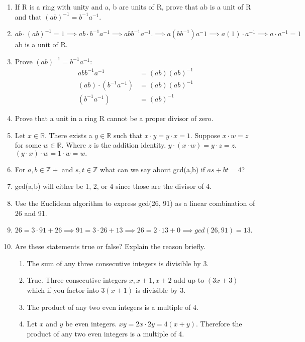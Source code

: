 \documentclass[letterpaper,11pt]{article}
\begin{document}
\begin{enumerate}
    \item If R is a ring with unity and a, b are units of R, prove that ab is a unit of R and that $(ab)^{-1} = b^{-1}a^{-1}$.
    \item[] $ab \cdot (ab)^{-1} = 1 \implies ab \cdot b^{-1}a^{-1} \implies abb^{-1}a^{-1}. \implies a(bb^{-1})a^-1 \implies a(1) \cdot a^{-1} \implies a \cdot a^{-1} = 1$ ab is a unit of R.
    \item[] Prove $(ab)^{-1} = b^{-1}a^{-1}:$ 
    \begin{align}
        abb^{-1}a^{-1} &= (ab)(ab)^{-1} \\
        (ab)\cdot(b^{-1}a^{-1}) &= (ab)(ab)^{-1} \\
        (b^{-1}a^{-1}) &= (ab)^{-1}
    \end{align}
    \item Prove that a unit in a ring R cannot be a proper divisor of zero.
    \item[] Let $x \in \mathbb{R}.$ There exists a $y \in \mathbb{R}$ such that $x \cdot y = y \cdot x = 1.$ Suppose $x \cdot w = z$ for some $w \in \mathbb{R}.$ Where $z$ is the addition identity. $y \cdot (x \cdot w) = y \cdot z = z.$ $(y \cdot x) \cdot w = 1 \cdot w = w.$ 
    \newpage
    \item For $a, b\in \mathbb{Z}+$ and $s, t \in \mathbb{Z}$ what can we say about gcd(a,b) if $as + bt = 4$?
    \item[] gcd(a,b) will either be 1, 2, or 4 since those are the divisor of 4. 
    \item Use the Euclidean algorithm to express gcd(26, 91) as a linear combination of 26 and 91.
    \item[] $26 = 3 \cdot 91 + 26 \implies 91 = 3 \cdot 26 + 13 \implies 26 = 2 \cdot 13 + 0 \implies gcd(26,91) = 13.$
    \item Are these statements true or false? Explain the reason briefly.
    \begin{enumerate}
        \item The sum of any three consecutive integers is divisible by 3.
        \item[] True. Three consecutive integers $x, x+1, x+2$ add up to $(3x + 3)$ which if you factor into $3(x+1)$ is divisible by 3. 
        \item The product of any two even integers is a multiple of 4.
        \item[] Let $x$ and $y$ be even integers. $xy = 2x \cdot 2y = 4(x+y).$ Therefore the product of any two even integers is a multiple of 4.
    \end{enumerate}
\end{enumerate}
\end{document}
